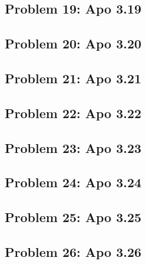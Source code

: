 \subsection[Problem 19]{Problem 19: Apo 3.19}

\subsection[Problem 20]{Problem 20: Apo 3.20}

\subsection[Problem 21]{Problem 21: Apo 3.21}

\subsection[Problem 22]{Problem 22: Apo 3.22}

\subsection[Problem 23]{Problem 23: Apo 3.23}

\subsection[Problem 24]{Problem 24: Apo 3.24}

\subsection[Problem 25]{Problem 25: Apo 3.25}

\subsection[Problem 26]{Problem 26: Apo 3.26}
